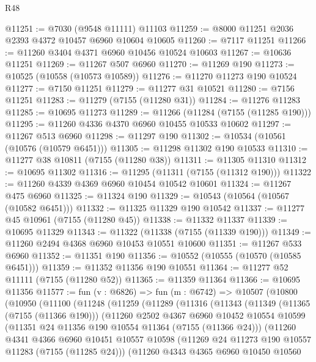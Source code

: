\begin{lexlean}{R48}
\begin{coremodule}
@11251 := @7030 (@9548 @11111) @11103
@11259 := @8000 @11251 @2036 @2393 @4372 @10457 @6960 @10604 @10605
@11260 := @7117 @11251
@11266 := @11260 @3404 @4371 @6960 @10456 @10524 @10603
@11267 := @10636 @11251
@11269 := @11267 @507 @6960
@11270 := @11269 @190
@11273 := @10525 (@10558 (@10573 @10589))
@11276 := @11270 @11273 @190 @10524
@11277 := @7150 @11251
@11279 := @11277 @31 @10521
@11280 := @7156 @11251
@11283 := @11279 (@7155 (@11280 @31))
@11284 := @11276 @11283
@11285 := @10695 @11273
@11289 := @11266 (@11284 (@7155 (@11285 @190)))
@11295 := @11260 @4336 @4370 @6960 @10455 @10533 @10602
@11297 := @11267 @513 @6960
@11298 := @11297 @190
@11302 := @10534 (@10561 (@10576 (@10579 @6451)))
@11305 := @11298 @11302 @190 @10533
@11310 := @11277 @38 @10811 (@7155 (@11280 @38))
@11311 := @11305 @11310
@11312 := @10695 @11302
@11316 := @11295 (@11311 (@7155 (@11312 @190)))
@11322 := @11260 @4339 @4369 @6960 @10454 @10542 @10601
@11324 := @11267 @475 @6960
@11325 := @11324 @190
@11329 := @10543 (@10564 (@10567 (@10582 @6451)))
@11332 := @11325 @11329 @190 @10542
@11337 := @11277 @45 @10961 (@7155 (@11280 @45))
@11338 := @11332 @11337
@11339 := @10695 @11329
@11343 := @11322 (@11338 (@7155 (@11339 @190)))
@11349 := @11260 @2494 @4368 @6960 @10453 @10551 @10600
@11351 := @11267 @533 @6960
@11352 := @11351 @190
@11356 := @10552 (@10555 (@10570 (@10585 @6451)))
@11359 := @11352 @11356 @190 @10551
@11364 := @11277 @52 @11111 (@7155 (@11280 @52))
@11365 := @11359 @11364
@11366 := @10695 @11356
@11577 := fun (v : @6826) =>
  fun (m : @6742) =>
  @10507
    (@10800
      (@10950
        (@11100
          (@11248
            (@11259
              (@11289
                (@11316
                  (@11343
                    (@11349
                      (@11365 (@7155 (@11366 @190)))
                      (@11260
                        @2502
                        @4367
                        @6960
                        @10452
                        @10554
                        @10599
                        (@11351 @24 @11356 @190 @10554 @11364 (@7155 (@11366 @24)))
                        (@11260
                          @4341
                          @4366
                          @6960
                          @10451
                          @10557
                          @10598
                          (@11269 @24 @11273 @190 @10557 @11283 (@7155 (@11285 @24)))
                          (@11260
                            @4343
                            @4365
                            @6960
                            @10450
                            @10560

\end{coremodule}
\end{lexlean}
